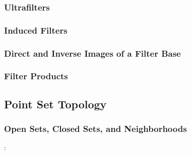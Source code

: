 \subsubsection{Ultrafilters}


\subsubsection{Induced Filters}


\subsubsection{Direct and Inverse Images of a Filter Base}


\subsubsection{Filter Products}





\subsection{Point Set Topology}
\subsubsection{Open Sets, Closed Sets, and Neighborhoods}







:





